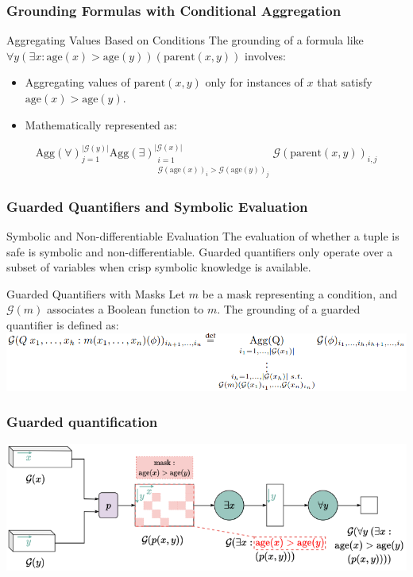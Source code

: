 \documentclass{beamer}
\newcommand{\G}{\mathcal{G}}
\begin{document}
\begin{frame}
\frametitle{Grounding Formulas with Conditional Aggregation}
\begin{block}{Aggregating Values Based on Conditions}
The grounding of a formula like \( \forall y (\exists x: \text{age}(x) > \text{age}(y)) (\text{parent}(x, y)) \) involves:
\begin{itemize}
    \item Aggregating values of \( \text{parent}(x, y) \) only for instances of \( x \) that satisfy \( \text{age}(x) > \text{age}(y) \).
    \item Mathematically represented as:
\end{itemize}
\[
\text{Agg}({\forall})_{j=1}^{|\G(y)|} \text{Agg}({\exists})_{\substack{i=1 \\ \G(\text{age}(x))_i > \G(\text{age}(y))_j}}^{|\G(x)|} \G(\text{parent}(x, y))_{i,j}
\]
\end{block}
\end{frame}

\begin{frame}
\frametitle{Guarded Quantifiers and Symbolic Evaluation}
\begin{block}{Symbolic and Non-differentiable Evaluation}
The evaluation of whether a tuple is safe is symbolic and non-differentiable. Guarded quantifiers only operate over a subset of variables when crisp symbolic knowledge is available.
\end{block}

\begin{block}{Guarded Quantifiers with Masks}
Let \( m \) be a mask representing a condition, and \( \G(m) \) associates a Boolean function to \( m \). The grounding of a guarded quantifier is defined as:
\includegraphics[width=\textwidth]{ltn5.png}
\end{block}
\end{frame}

\begin{frame}
  \frametitle{Guarded quantification}
  \includegraphics[width=\textwidth]{ltn6.png}
\end{frame}
\end{document}
